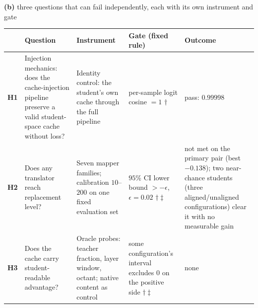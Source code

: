 \vspace{1.6mm}
{\footnotesize\textbf{(b)} three questions that can fail independently,
each with its own instrument and gate\par}
\vspace{1.2mm}
{\footnotesize
\setlength{\tabcolsep}{3pt}%
\begin{tabular}{@{}p{0.62cm}p{2.85cm}p{3.55cm}p{3.05cm}p{2.45cm}@{}}
\toprule
 & \textbf{Question} & \textbf{Instrument} & \textbf{Gate (fixed rule)} & \textbf{Outcome} \\
\midrule
\textbf{H1} & Injection mechanics: does the cache-injection pipeline preserve a
valid student-space cache without loss?
 & Identity control: the student's own cache through the full pipeline
 & per-sample logit cosine $=1$ $\dagger$
 & pass: $0.99998$ \\
\addlinespace[1pt]
\textbf{H2} & Does any translator reach replacement level?
 & Seven mapper families; calibration $10$--$200$ on one fixed evaluation set
 & $95\%$ CI lower bound $>-\epsilon$, $\epsilon{=}0.02$ $\dagger\ddagger$
 & not met on the primary pair (best $-0.138$); two near-chance students
 (three aligned/unaligned configurations) clear it with no measurable gain \\
\addlinespace[1pt]
\textbf{H3} & Does the cache carry student-readable advantage?
 & Oracle probes: teacher fraction, layer window, octant; native content as control
 & some configuration's interval excludes $0$ on the positive side $\dagger\ddagger$
 & none \\
\bottomrule
\end{tabular}}
